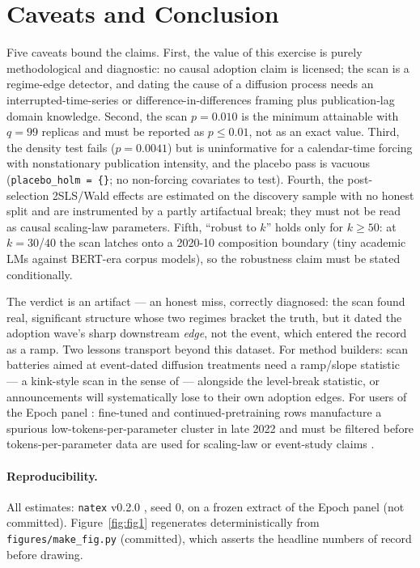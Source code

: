 \documentclass[11pt]{article}
\newcommand{\natex}{\texttt{natex}}
\begin{document}
\section{Caveats and Conclusion}\label{sec:conclusion}

Five caveats bound the claims. First, the value of this exercise is purely
methodological and diagnostic: no causal adoption claim is licensed; the scan
is a regime-edge detector, and dating the cause of a diffusion process needs
an interrupted-time-series or difference-in-differences framing
\cite{bernal2017} plus publication-lag domain knowledge. Second, the scan
$p = 0.010$ is the minimum attainable with $q = 99$ replicas and must be
reported as $p \leq 0.01$, not as an exact value. Third, the density test
fails ($p = 0.0041$) but is uninformative for a calendar-time forcing with
nonstationary publication intensity, and the placebo pass is vacuous
(\texttt{placebo\_holm = \{\}}; no non-forcing covariates to test). Fourth,
the post-selection 2SLS/Wald effects are estimated on the discovery sample
with no honest split and are instrumented by a partly artifactual break; they
must not be read as causal scaling-law parameters. Fifth, ``robust to $k$''
holds only for $k \geq 50$: at $k = 30$/$40$ the scan latches onto a 2020-10
composition boundary (tiny academic LMs against BERT-era corpus models), so
the robustness claim must be stated conditionally.

The verdict is an artifact --- an honest miss, correctly diagnosed: the scan
found real, significant structure whose two regimes bracket the truth, but it
dated the adoption wave's sharp downstream \emph{edge}, not the event, which
entered the record as a ramp. Two lessons transport beyond this dataset. For
method builders: scan batteries aimed at event-dated diffusion treatments
need a ramp/slope statistic --- a kink-style scan in the sense of
\cite{bockerman2025} --- alongside the level-break statistic, or
announcements will systematically lose to their own adoption edges. For
users of the Epoch panel \cite{epoch2024}: fine-tuned and
continued-pretraining rows manufacture a spurious low-tokens-per-parameter
cluster in late 2022 and must be filtered before tokens-per-parameter data
are used for scaling-law or event-study claims
\cite{hoffmann2022,besiroglu2024}.

\paragraph{Reproducibility.} All estimates: \natex{} v0.2.0 \cite{natex},
seed 0, on a frozen extract of the Epoch panel \cite{epoch2024} (not
committed). Figure~\ref{fig:fig1} regenerates deterministically from
\texttt{figures/make\_fig.py} (committed), which asserts the headline
numbers of record before drawing.
\end{document}
